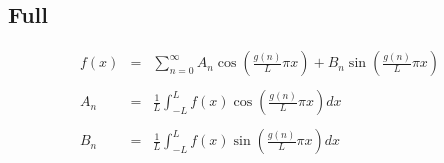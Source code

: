 \documentclass[12pt]{article}
\begin{document}
\subsection{Full}
	\begin{eqnarray*}
	 f(x) &=& \displaystyle\sum\limits_{n = 0}^{\infty} A_n \cos\left(\frac{g(n)}{L}\pi x \right) + B_n \sin \left( \frac{g(n)}{L} \pi x \right) \\ \\
	A_n &=&  \displaystyle \frac{1}{L} \int_{-L}^{L} f(x)\cos\left(\frac{g(n)}{L}\pi x\right) dx \\ \\
	B_n &=&  \displaystyle \frac{1}{L} \int_{-L}^{L} f(x)\sin\left(\frac{g(n)}{L}\pi x\right) dx \\ \\
	\end{eqnarray*}
\end{document}
